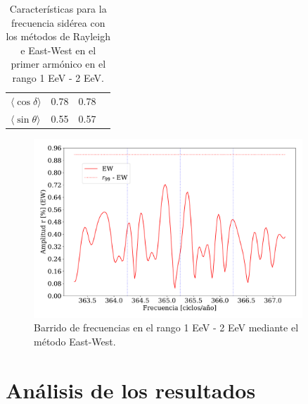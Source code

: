 \documentclass[11pt, letterpaper,oneside]{article}
\begin{document}
\begin{table}[H]
\begin{small}
\begin{center}
\begin{tabular}[c]{l|c|c||c|}
\multicolumn{1}{|l|}{$\langle\cos\delta\rangle$}&{0.78}                               & 0.78       \\        
\multicolumn{1}{|l|}{$\langle\sin\theta\rangle$}&{0.55}                               & 0.57       \\ \hline       
\end{tabular}
        \end{center}
    \end{small}
    \vspace*{-0.21 cm}
    \caption{Características para la frecuencia sidérea con los métodos de Rayleigh  e East-West en el primer armónico en el rango 1 EeV - 2 EeV.}
    \label{tab:siderea_3}
\end{table}



\begin{figure}[H]
    \begin{small}
        \begin{center}
            
            \includegraphics[width=0.9\textwidth]{Figs/plot_bin_3_barrido_v3_EW.pdf}
            \vspace*{-1 cm}
        \end{center}
        \caption{Barrido de frecuencias en el rango 1 EeV - 2 EeV mediante el método East-West.}
        \label{fig:tercer_barrido}
    \end{small}
\end{figure}    

\section{Análisis de los resultados}
\end{document}
